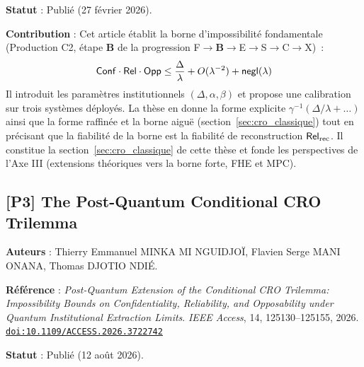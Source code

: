 \begin{sloppypar}
\noindent\textbf{Statut} : Publi\'e (27 f\'evrier 2026).

\noindent\textbf{Contribution} : Cet article \'etablit la borne 
d'impossibilit\'e fondamentale (Production C2, \'etape \textbf{B} de la progression 
F$\to$\textbf{B}$\to$E$\to$S$\to$C$\to$X)~:
\begin{equation}
\mathsf{Conf} \cdot \mathsf{Rel} \cdot \mathsf{Opp} \leq \frac{\Delta}{\lambda} + O(\lambda^{-2}) + \mathsf{negl}(\lambda)
\end{equation}
Il introduit les param\`etres institutionnels $(\Delta, \alpha, \beta)$ et
propose une calibration sur trois syst\`emes d\'eploy\'es. La th\`ese en donne la
forme explicite $\gamma^{-1}(\Delta/\lambda + \dots)$ ainsi que la forme raffin\'ee et la borne aigu\"e
(section~\ref{sec:cro_classique}) tout en pr\'ecisant que la fiabilit\'e de la borne est
la fiabilit\'e de reconstruction $\mathsf{Rel}_{\mathrm{rec}}$. Il constitue la section~\ref{sec:cro_classique} de cette th\`ese et 
fonde les perspectives de l'Axe III (extensions th\'eoriques vers la borne forte, 
FHE et MPC).

\vspace{0.5cm}

\subsection{[P3] The Post-Quantum Conditional CRO Trilemma}

\noindent\textbf{Auteurs} : Thierry Emmanuel MINKA MI NGUIDJO\"{I},
Flavien Serge MANI ONANA, Thomas DJOTIO NDI\'E.

\noindent\textbf{R\'ef\'erence} : \textit{Post-Quantum Extension of the
Conditional CRO Trilemma: Impossibility Bounds on Confidentiality,
Reliability, and Opposability under Quantum Institutional Extraction Limits}.
\textit{IEEE Access}, 14, 125130--125155,  2026.
\href{https://doi.org/10.1109/ACCESS.2026.3722742}{\texttt{doi:10.1109/ACCESS.2026.3722742}}

\noindent\textbf{Statut} : Publi\'e (12 ao\^ut 2026).


\end{sloppypar}
